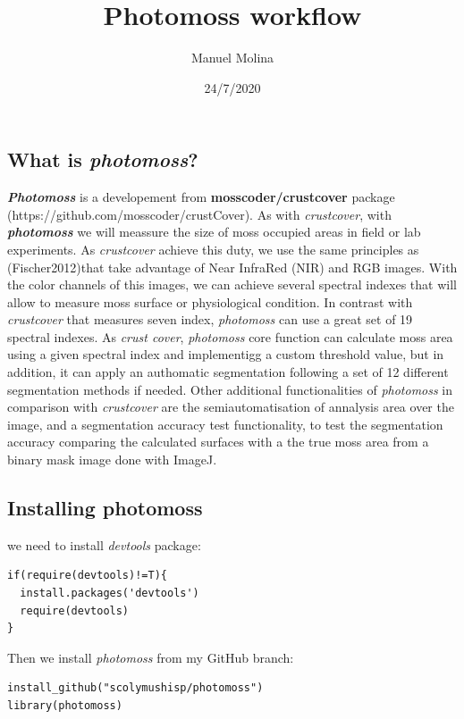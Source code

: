 \documentclass[
]{article}
\title{Photomoss workflow}
\author{Manuel Molina}
\date{24/7/2020}
\begin{document}
\maketitle

\hypertarget{what-is-photomoss}{%
\subsection{\texorpdfstring{What is
\emph{photomoss}?}{What is photomoss?}}\label{what-is-photomoss}}

\emph{\textbf{Photomoss}} is a developement from
\textbf{mosscoder/crustcover} package
(https://github.com/mosscoder/crustCover). As with \emph{crustcover},
with \emph{\textbf{photomoss}} we will meassure the size of moss
occupied areas in field or lab experiments. As \emph{crustcover} achieve this duty, we use the same principles as (Fischer2012)that 
take advantage of Near InfraRed (NIR) and RGB images.
With the color channels of this images, we can achieve several spectral
indexes that will allow to measure moss surface or physiological
condition. In contrast with \emph{crustcover} that measures seven index,
\emph{photomoss} can use a great set of 19 spectral indexes. As
\emph{crust cover}, \emph{photomoss} core function can calculate moss
area using a given spectral index and implementigg a custom threshold
value, but in addition, it can apply an authomatic segmentation
following a set of 12 different segmentation methods if needed. Other
additional functionalities of \emph{photomoss} in comparison with
\emph{crustcover} are the semiautomatisation of annalysis area over the
image, and a segmentation accuracy test functionality, to test the
segmentation accuracy comparing the calculated surfaces with a the true
moss area from a binary mask image done with ImageJ.

\hypertarget{installing-photomoss}{%
\subsection{Installing photomoss}\label{installing-photomoss}}

we need to install \emph{devtools} package:

\begin{verbatim}
if(require(devtools)!=T){
  install.packages('devtools')
  require(devtools)
}
\end{verbatim}

Then we install \emph{photomoss} from my GitHub branch:

\begin{verbatim}
install_github("scolymushisp/photomoss")
library(photomoss)
\end{verbatim}
\end{document}
